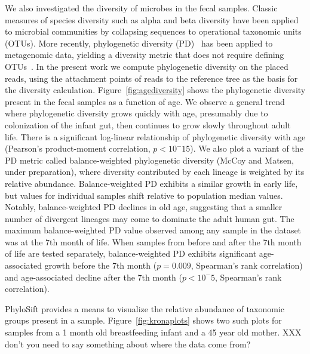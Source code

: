 \documentclass[10pt]{article}
\begin{document}
We also investigated the diversity of microbes in the fecal samples.
Classic measures of species diversity such as alpha and beta diversity have been applied to microbial communities by collapsing sequences to operational taxonomic units (OTUs).
More recently, phylogenetic diversity (PD)~\cite{Faith1992} has been applied to metagenomic data, yielding a diversity metric that does not require defining OTUs~\cite{Kembel2011}.
In the present work we compute phylogenetic diversity on the placed reads, using the attachment points of reads to the reference tree as the basis for the diversity calculation.
Figure~\ref{fig:agediversity} shows the phylogenetic diversity present in the fecal samples as a function of age.
We observe a general trend where phylogenetic diversity grows quickly with age, presumably due to colonization of the infant gut, then continues to grow slowly throughout adult life.
There is a significant log-linear relationship of phylogenetic diversity with age (Pearson's product-moment correlation, $p<10^-15$).
We also plot a variant of the PD metric called balance-weighted phylogenetic diversity (McCoy and Matsen, under preparation), where diversity contributed by each lineage is weighted by its relative abundance.
Balance-weighted PD exhibits a similar growth in early life, but values for individual samples shift relative to population median values.
Notably, balance-weighted PD declines in old age, suggesting that a smaller number of divergent lineages may come to dominate the adult human gut.
The maximum balance-weighted PD value observed among any sample in the dataset was at the 7th month of life.
When samples from before and after the 7th month of life are tested separately, balance-weighted PD exhibits significant age-associated growth before the 7th month ($p=0.009$, Spearman's rank correlation) and age-associated decline after the 7th month ($p<10^-5$, Spearman's rank correlation).

PhyloSift provides a means to visualize the relative abundance of taxonomic groups present in a sample.
Figure~\ref{fig:kronaplots} shows two such plots for samples from a 1 month old breastfeeding infant and a 45 year old mother.
XXX don't you need to say something about where the data come from?
\end{document}
